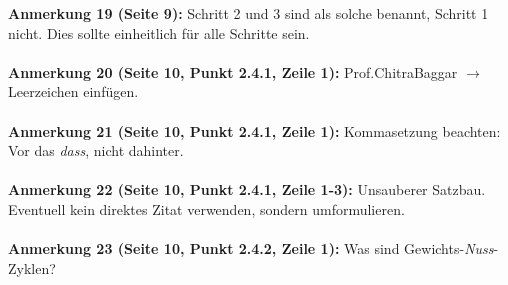 \documentclass[a4paper,12pt]{book}
\begin{document}
\noindent
\textbf{Anmerkung 19 (Seite 9):}
Schritt 2 und 3 sind als solche benannt, Schritt 1 nicht. Dies sollte einheitlich für alle Schritte sein. \\
\\

\noindent
\textbf{Anmerkung 20 (Seite 10, Punkt 2.4.1, Zeile 1):}
Prof.ChitraBaggar $\rightarrow$ Leerzeichen einfügen. \\
\\

\noindent
\textbf{Anmerkung 21 (Seite 10, Punkt 2.4.1, Zeile 1):}
Kommasetzung beachten: Vor das \emph{dass}, nicht dahinter. \\
\\

\noindent
\textbf{Anmerkung 22 (Seite 10, Punkt 2.4.1, Zeile 1-3):}
Unsauberer Satzbau. Eventuell kein direktes Zitat verwenden, sondern umformulieren. \\
\\

\noindent
\textbf{Anmerkung 23 (Seite 10, Punkt 2.4.2, Zeile 1):}
Was sind Gewichts-\emph{Nuss}-Zyklen? \\
\\
\end{document}

